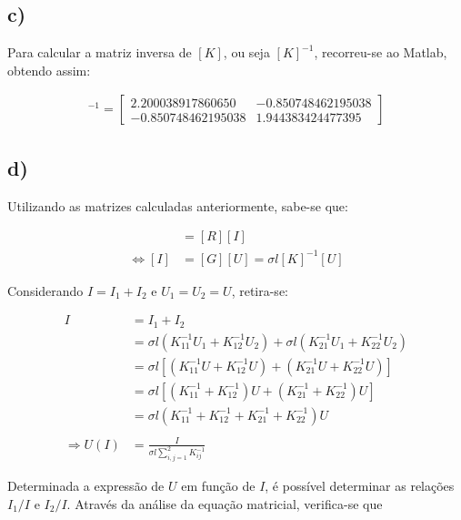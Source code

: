 \documentclass[portuguese, a4paper]{article}
\newcommand{\eq}{\Leftrightarrow} %
\begin{document}
	\subsection{c)}

		\par
		Para calcular a matriz inversa de $[K]$, ou seja $[K]^{-1}$, recorreu-se ao Matlab, obtendo assim:

		\begin{align*}
			[K]^{-1} =
			\begin{bmatrix}
				2.200038917860650  & -0.850748462195038 \\
  				-0.850748462195038 & 1.944383424477395
			\end{bmatrix}
		\end{align*}

	\subsection{d)}

		\par
		Utilizando as matrizes calculadas anteriormente, sabe-se que:

		\begin{align*}
				[U] &= [R][I] \\
			\eq [I] &= [G][U] = \sigma l [K]^{-1}[U]
		\end{align*}

		\par
		Considerando $I = I_1 + I_2$ e $U_1 = U_2 = U$, retira-se:

		\begin{align*}
			I &= I_1 + I_2 \\
			&= \sigma l \left(K^{-1}_{11}U_1 + K^{-1}_{12}U_2\right) + \sigma l \left(K^{-1}_{21}U_1 + K^{-1}_{22}U_2\right)  \\
			&= \sigma l \left[ \left(K^{-1}_{11}U + K^{-1}_{12}U\right) + \left(K^{-1}_{21}U + K^{-1}_{22}U\right) \right] \\
			&= \sigma l \left[ \left(K^{-1}_{11} + K^{-1}_{12}\right)U + \left(K^{-1}_{21} + K^{-1}_{22}\right)U \right] \\
			&= \sigma l \left( K^{-1}_{11} + K^{-1}_{12} + K^{-1}_{21} + K^{-1}_{22} \right) U\\ \\
			\Rightarrow U(I) &= \frac{I}{\sigma l \sum\limits_{i,j=1}^{2} K^{-1}_{ij}}
		\end{align*}

		\par
		Determinada a expressão de $U$ em função de $I$, é possível determinar as relações $I_1/I$ e $I_2/I$. Através da análise da equação matricial, verifica-se que
\end{document}

